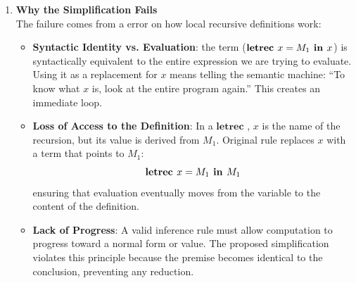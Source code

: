 \begin{solution}
\begin{enumerate}
\begin{enumerate}
\begin{enumerate}
    \item \textbf{Result}: the expression terminates correctly and returns a value.
\end{enumerate}
        \item \textbf{Evaluation Using the Simplified (Incorrect) Rule}
\[\frac
{M_2[(\text{\textbf{letrec }} x = M_1 \text{\textbf{ in }} x)/x]\Downarrow V}
{\text{\textbf{letrec}} x = M_1 \text{ in } M_2 \Downarrow  V}
\]
\begin{enumerate}
    \item We must evaluate the body $M_2$ (i.e. $x$), replacing every occurrence with:
\[\textbf{letrec } x = 0 \textbf{ in } x\]
\item The premise expression becomes: 
    \[x[(\textbf{letrec } x = 0 \textbf{ in } 0)/x]\]
    which is
    \[\textbf{letrec } x = 0 \textbf{ in } 0\]
    \item To evaluate this premise, we apply the same rule again. 
    \item This forces us to evaluate once more 
    \[\textbf{letrec } x = 0 \textbf{ in } 0\]
    as the premise of the premise.
    \item This generates an infinite chain of identical derivations that never reaches the constant $0$.
    \item \textbf{Result}: the expression diverges and never returns a value.
\end{enumerate}
    \end{enumerate}
	
\item \textbf{Why the Simplification Fails}
\\
The failure comes from a error on how local recursive definitions work:
\begin{itemize}
    \item \textbf{Syntactic Identity vs. Evaluation}:
the term ($\textbf{letrec } x = M_1 \text{\textbf{ in }} x$) is syntactically equivalent to the entire expression we are trying to evaluate.
Using it as a replacement for $x$ means telling the semantic machine: “To know what $x$ is, look at the entire program again.”
This creates an immediate loop.
\item \textbf{Loss of Access to the Definition}: In a $\textbf{letrec }$, $x$ is the name of the recursion, but its value is derived from $M_1$.
Original rule replaces $x$ with a term that points to $M_1$:
\[\textbf{letrec } x = M_1 \text{\textbf{ in }} M_1\]
ensuring that evaluation eventually moves from the variable to the content of the definition.
\item \textbf{Lack of Progress}: A valid inference rule must allow computation to progress toward a normal form or value.
The proposed simplification violates this principle because the premise becomes identical to the conclusion, preventing any reduction.
\end{itemize}


\end{enumerate}
\end{solution}

